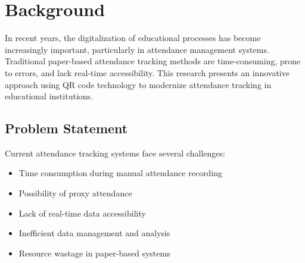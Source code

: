 \section{Background}
\textcolor{TextBlack}{
    In recent years, the digitalization of educational processes has become increasingly important, 
    particularly in attendance management systems. Traditional paper-based attendance tracking methods 
    are time-consuming, prone to errors, and lack real-time accessibility. This research presents an 
    innovative approach using QR code technology to modernize attendance tracking in educational institutions.
}

\subsection{Problem Statement}
\textcolor{TextBlack}{
    Current attendance tracking systems face several challenges:
    \begin{itemize}
        \item Time consumption during manual attendance recording
        \item Possibility of proxy attendance
        \item Lack of real-time data accessibility
        \item Inefficient data management and analysis
        \item Resource wastage in paper-based systems
    \end{itemize}
}
